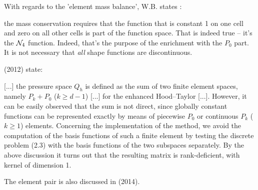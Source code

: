 With regards to the 'element mass balance', W.B. states : 
\begin{displayquote}
{\color{darkgray}
the mass conservation requires that the function that is constant 1 
on one cell and zero on all other cells is part of the function space. 
That is indeed true -- it's the ${\mathcal{N}}_4$ function. Indeed, that's the purpose of 
the enrichment with the $P_0$ part. It is not necessary that {\it all} shape functions are discontinuous.
}
\end{displayquote}




\textcite{bocg12} (2012) state: 
\begin{displayquote}
{\color{darkgray}
[...] the pressure space $Q_h$ is defined as the sum of two finite 
element spaces, namely $P_k+P_0$ ($k \ge d- 1$) [...] for the enhanced 
Hood–Taylor [...]. However, it can be easily observed that the sum is not direct, 
since globally constant functions can be represented exactly by means of piecewise 
$P_0$ or continuous $P_k$ ($k \ge 1$) elements.
Concerning the implementation of the method, we avoid the computation of the basis
functions of such a finite element by testing the discrete problem (2.3) 
with the basis 
functions of the two subspaces separately. By the above discussion it 
turns out that the resulting
matrix is rank-deficient, with kernel of dimension 1.
}
\end{displayquote}

The element pair is also discussed in \textcite{chen14} (2014).

